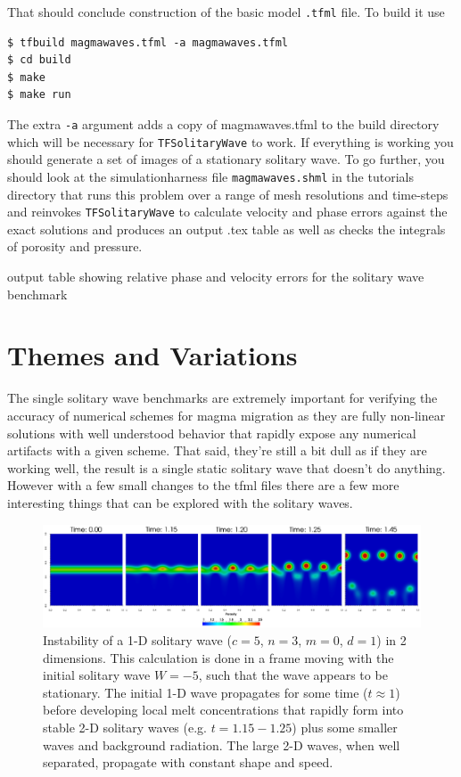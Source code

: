 That should conclude construction of the basic model \texttt{.tfml}
file.  To build it use
\begin{lstlisting}[style=Bash]
$ tfbuild magmawaves.tfml -a magmawaves.tfml
$ cd build
$ make
$ make run 
\end{lstlisting}
The extra \texttt{-a} argument adds a copy of magmawaves.tfml to the
build directory which will be necessary for \texttt{TFSolitaryWave} to
work.  If everything is working you should generate a set of images of a
stationary solitary wave.  To go further, you should look at the
simulationharness file \texttt{magmawaves.shml} in the tutorials directory
that runs this problem over a range of mesh resolutions and time-steps
and reinvokes \texttt{TFSolitaryWave} to calculate velocity and phase
errors against the exact solutions and produces an output .tex table
as well as checks the integrals of porosity and pressure.
\begin{table}[h]
  \centering
  \caption{output table showing relative phase and velocity errors for the
    solitary wave benchmark}
  \label{benchmark_table}
  
\end{table}


\section{Themes and Variations}
\label{sec:themes-variations}

The single solitary wave benchmarks are extremely important for
verifying the accuracy of numerical schemes for magma migration as
they are fully non-linear solutions with well understood behavior that
rapidly expose any numerical artifacts with a given scheme.  That
said,  they're still a bit dull as if they are working well,  the
result is a single static solitary wave that doesn't do anything.
However with a few small changes to the tfml files  there are a few
more interesting things that can be explored with the solitary waves. 

\begin{figure}[htbp!]
  \centering
  \includegraphics[width=\textwidth]{figures/1dto2d.pdf}
  \caption{Instability of a 1-D solitary wave ($c=5$, $n=3$, $m=0$,
    $d=1$) in 2 dimensions. This calculation is done in a frame moving
    with the initial solitary wave $W=-5$, such that the wave appears
    to be stationary. The initial 1-D wave propagates for some time
    ($t\approx 1$) before developing local melt concentrations that
    rapidly form into stable 2-D solitary waves (e.g. $t=1.15-1.25$)
    plus some smaller waves and background radiation.  The large 2-D
    waves, when well separated, propagate with constant shape and speed.}
  \label{fig:1dto2d}
\end{figure}

